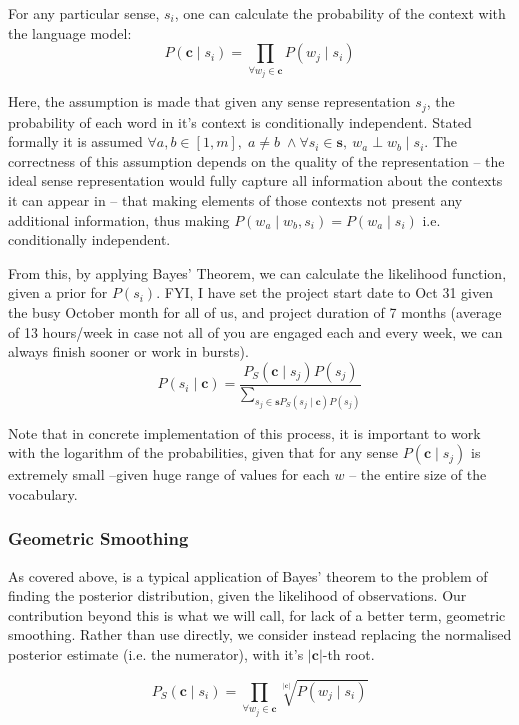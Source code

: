 \documentclass{sig-alternate}
\renewcommand{\c}{\mathbf{c}}
\newcommand{\s}{\mathbf{s}}
\begin{document}
For any particular sense, $s_i$, one can calculate the probability of the context with the language model:
\begin{equation} \label{eq:contextprobtrue} P(\c \mid s_{i})=\prod_{\forall w_{j}\in\c}P(w_{j} \mid s_{i})
\end{equation}

Here, the assumption is made that given any sense representation $s_j$, the probability of each word in it's context is conditionally independent. Stated formally it is assumed $\forall a,b \in [1,m],\; a \ne b\; \wedge \forall s_i \in \s,\:w_a \perp w_b \mid s_i$.
The correctness of this assumption depends on the quality of the representation -- the ideal sense representation would fully capture all information about the contexts it can appear in -- that making elements of those contexts not present any additional information, thus making $P(w_a \mid w_b,s_i)=P(w_a \mid s_i)$ i.e. conditionally independent.


From this, by applying Bayes' Theorem, we can calculate the likelihood function, given a prior for $P(s_i)$.
FYI, I have set the project start date to Oct 31 given the busy October month for all of us, and project duration of 7 months (average of 13 hours/week in case not all of you are engaged each and every week, we can always finish sooner or work in bursts). 
\begin{equation} \label{eq:generalwsd}
P(s_{i} \mid \c) = \dfrac{P_S(\c \mid s_{j})P(s_{j})}{\sum_{s_{j}\in\s P_S(s_{j} \mid \c)P(s_{j})}}
\end{equation}

Note that in concrete implementation of this process, it is important to work with the logarithm of the probabilities, given that for any sense $P(\c \mid s_j)$ is extremely small --given huge range of values for each $w$ -- the entire size of the vocabulary.

\subsubsection{Geometric Smoothing}
As covered above, is a typical application of Bayes' theorem to the problem of finding the posterior distribution, given the likelihood of observations.
Our contribution beyond this is what we will call, for lack of a better term, geometric smoothing.
Rather than use  directly, we consider instead replacing the normalised posterior estimate (i.e. the numerator), with it's $|\c|$-th root.

\begin{equation} \label{eq:contrextprobsmooth}
P_S(\c \mid s_{i})=\prod_{\forall w_{j}\in\c}\sqrt[|\c|]{P(w_{j} \mid s_{i})}
\end{equation}
\end{document}
